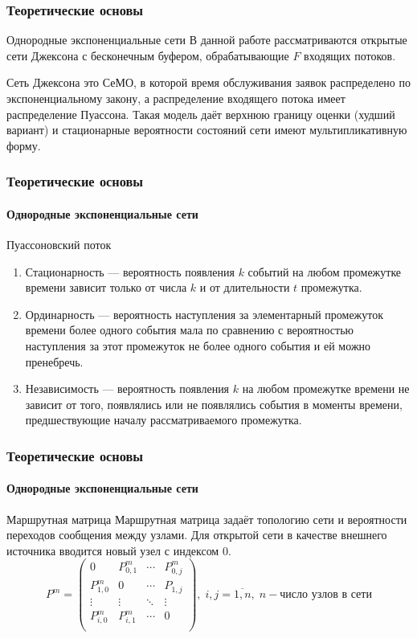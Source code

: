 \documentclass[aspectratio=169]{beamer}
\begin{document}
\begin{frame}
\frametitle{Теоретические основы}

\begin{block}{Однородные экспоненциальные сети}
В данной работе рассматриваются открытые сети Джексона с бесконечным буфером, обрабатывающие \( F \) входящих потоков.

Сеть Джексона это СеМО, в которой время обслуживания заявок распределено по экспоненциальному закону, а распределение входящего потока имеет распределение Пуассона. Такая модель даёт верхнюю границу оценки (худший вариант)
и стационарные вероятности состояний сети имеют мультипликативную форму.
\end{block}	
\end{frame}

\begin{frame}
\frametitle{Теоретические основы}
\framesubtitle{Однородные экспоненциальные сети}

\begin{block}{Пуассоновский поток}
\begin{enumerate}
	\item Стационарность --- вероятность появления \( k \) событий на любом промежутке времени зависит только от числа \( k \) и от длительности
	\( t \) промежутка.
	
	\item Ординарность --- вероятность наступления за элементарный промежуток времени более одного события мала по сравнению с вероятностью
	наступления за этот промежуток не более одного события и ей можно пренебречь.
	
	\item Независимость --- вероятность появления \( k \) на любом промежутке времени не зависит от того, появлялись или не появлялись
	события в моменты времени, предшествующие началу рассматриваемого промежутка.
\end{enumerate}
\end{block}
\end{frame}

\begin{frame}
\frametitle{Теоретические основы}
\framesubtitle{Однородные экспоненциальные сети}

\begin{block}{Маршрутная матрица}
Маршрутная матрица задаёт топологию сети и вероятности переходов сообщения между узлами.
Для открытой сети в качестве внешнего источника вводится новый узел с индексом \( 0 \).
\[ P^{m} = \left(\begin{matrix}
                0 			& P_{0,1}^{m}	& \cdots 	& P_{0,j}^{m} \\
                P_{1,0}^{m} 	& 0				& \cdots		& P_{1,j} \\
                \vdots 		& \vdots			& \ddots		& \vdots  \\
                P_{i,0}^{m} 	& P_{i,1}^{m} 	& \cdots		& 0 \\
            \end{matrix}\right), \; i,j = \overline{1,n}, \; n - \text{число узлов в сети} \]
\end{block}
\end{frame}
\end{document}
